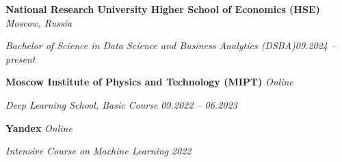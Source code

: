 

\textbf{National Research University Higher School of Economics (HSE)} \hfill \emph{Moscow, Russia}

	\textit{Bachelor of Science in Data Science and Business Analytics (DSBA)}\hfill \emph{09.2024 – present}\vspace{0.2cm}
	
	\textbf{Moscow Institute of Physics and Technology (MIPT)} \hfill \emph{Online}
	
\textit{Deep Learning School, Basic Course} \hfill \emph{09.2022 – 06.2023}\vspace{0.2cm}

\textbf{Yandex} \hfill \emph{Online}

\textit{Intensive Course on Machine Learning} \hfill \emph{2022}